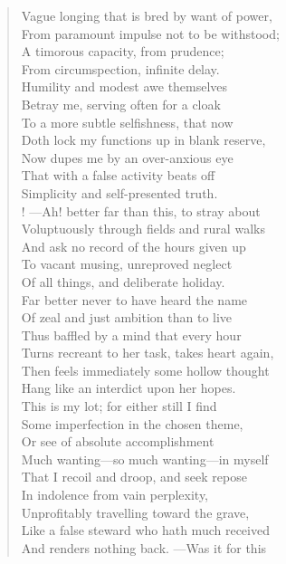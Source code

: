 \begin{verse}
Vague longing that is bred by want of power,  \\
From paramount impulse not to be withstood;  \\
A timorous capacity, from prudence;	  \\
From circumspection, infinite delay.  \\
Humility and modest awe themselves  \\
Betray me, serving often for a cloak  \\
To a more subtle selfishness, that now  \\
Doth lock my functions up in blank reserve,	  \\
Now dupes me by an over-anxious eye  \\
That with a false activity beats off  \\
Simplicity and self-presented truth.  \\!
---Ah! better far than this, to stray about  \\
Voluptuously through fields and rural walks	  \\
And ask no record of the hours given up  \\
To vacant musing, unreproved neglect  \\
Of all things, and deliberate holiday.  \\
Far better never to have heard the name  \\
Of zeal and just ambition than to live	  \\
Thus baffled by a mind that every hour  \\
Turns recreant to her task, takes heart again,  \\
Then feels immediately some hollow thought  \\
Hang like an interdict upon her hopes.  \\
This is my lot; for either still I find	  \\
Some imperfection in the chosen theme,  \\
Or see of absolute accomplishment  \\
Much wanting---so much wanting---in myself  \\
That I recoil and droop, and seek repose  \\
In indolence from vain perplexity,	  \\
Unprofitably travelling toward the grave,  \\
Like a false steward who hath much received  \\
And renders nothing back. ---Was it for this  \\

\end{verse}
